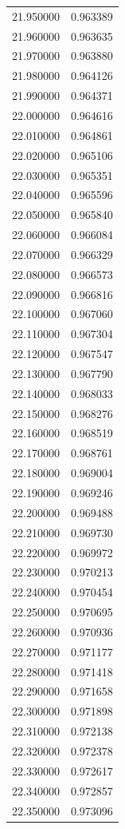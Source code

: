 \begin{tabular}{rr}
21.950000 & 0.963389 \\
21.960000 & 0.963635 \\
21.970000 & 0.963880 \\
21.980000 & 0.964126 \\
21.990000 & 0.964371 \\
22.000000 & 0.964616 \\
22.010000 & 0.964861 \\
22.020000 & 0.965106 \\
22.030000 & 0.965351 \\
22.040000 & 0.965596 \\
22.050000 & 0.965840 \\
22.060000 & 0.966084 \\
22.070000 & 0.966329 \\
22.080000 & 0.966573 \\
22.090000 & 0.966816 \\
22.100000 & 0.967060 \\
22.110000 & 0.967304 \\
22.120000 & 0.967547 \\
22.130000 & 0.967790 \\
22.140000 & 0.968033 \\
22.150000 & 0.968276 \\
22.160000 & 0.968519 \\
22.170000 & 0.968761 \\
22.180000 & 0.969004 \\
22.190000 & 0.969246 \\
22.200000 & 0.969488 \\
22.210000 & 0.969730 \\
22.220000 & 0.969972 \\
22.230000 & 0.970213 \\
22.240000 & 0.970454 \\
22.250000 & 0.970695 \\
22.260000 & 0.970936 \\
22.270000 & 0.971177 \\
22.280000 & 0.971418 \\
22.290000 & 0.971658 \\
22.300000 & 0.971898 \\
22.310000 & 0.972138 \\
22.320000 & 0.972378 \\
22.330000 & 0.972617 \\
22.340000 & 0.972857 \\
22.350000 & 0.973096 \\

\end{tabular}
